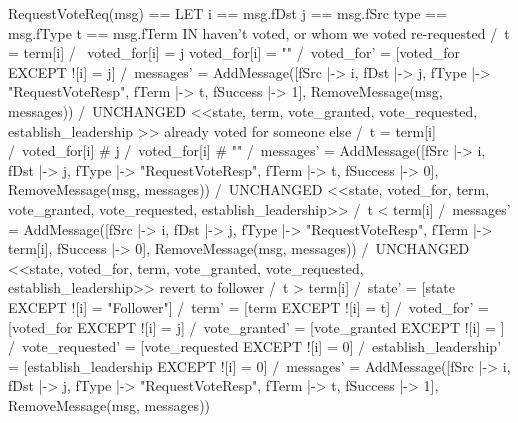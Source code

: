 \begin{tla}
RequestVoteReq(msg) == 
    LET 
        i == msg.fDst
        j == msg.fSrc
        type == msg.fType
        t == msg.fTerm
    IN 
        \* haven't voted, or whom we voted re-requested
        \/ /\ t = term[i]
           /\ \/ voted_for[i] = j 
              \/ voted_for[i] = ""
           /\ voted_for' = [voted_for EXCEPT ![i] = j]
           /\ messages' = AddMessage([fSrc |-> i, 
                                        fDst |-> j, 
                                        fType |-> "RequestVoteResp",
                                        fTerm |-> t, 
                                        fSuccess |-> 1],
                                        RemoveMessage(msg, messages))
           /\ UNCHANGED <<state, term, vote_granted, 
                vote_requested, establish_leadership >>
        \* already voted for someone else
        \/ /\ t = term[i]
           /\ voted_for[i] # j 
           /\ voted_for[i] # ""
           /\ messages' = AddMessage([fSrc |-> i, 
                                        fDst |-> j, 
                                        fType |-> "RequestVoteResp",
                                        fTerm |-> t, 
                                        fSuccess |-> 0],
                                        RemoveMessage(msg, messages))
            /\ UNCHANGED <<state, voted_for, term, 
                vote_granted, vote_requested, establish_leadership>>
        \/  /\ t < term[i]
            /\ messages' = AddMessage([fSrc |-> i, 
                                        fDst |-> j, 
                                        fType |-> "RequestVoteResp",
                                        fTerm |-> term[i], 
                                        fSuccess |-> 0],
                                        RemoveMessage(msg, messages))
            /\ UNCHANGED <<state, voted_for, term, 
                vote_granted, vote_requested, establish_leadership>>
        \* revert to follower
        \/  /\ t > term[i]
            /\ state' = [state EXCEPT ![i] = "Follower"]
            /\ term' = [term EXCEPT ![i] = t]
            /\ voted_for' = [voted_for EXCEPT ![i] = j]
            /\ vote_granted' = [vote_granted EXCEPT ![i] = {}]
            /\ vote_requested' = [vote_requested EXCEPT ![i] = 0]
            /\ establish_leadership' = [establish_leadership EXCEPT ![i] = 0]
            /\ messages' = AddMessage([fSrc |-> i, 
                                        fDst |-> j, 
                                        fType |-> "RequestVoteResp",
                                        fTerm |-> t, 
                                        fSuccess |-> 1],
                                        RemoveMessage(msg, messages))
\end{tla}
